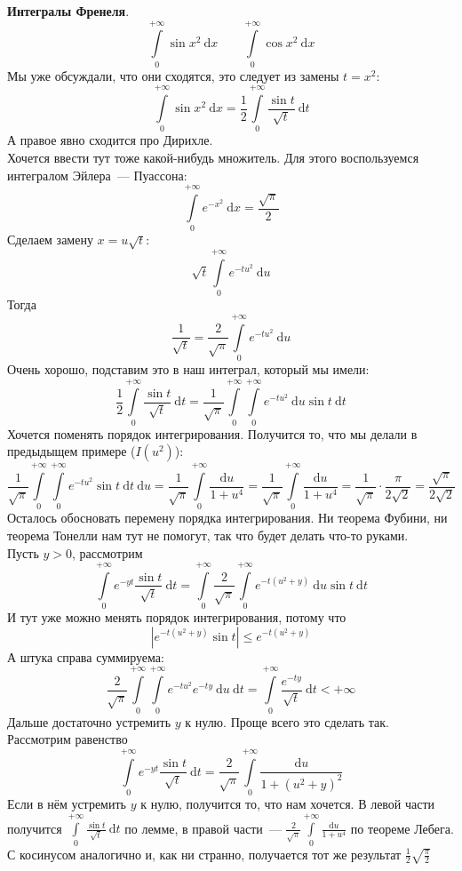 \documentclass{article}
\begin{document}
    \begin{example}
        \textbf{Интегралы Френеля}.\\
        $$
        \int\limits_0^{+\infty}\sin x^2~\mathrm dx\qquad\int\limits_0^{+\infty}\cos x^2~\mathrm dx
        $$
        Мы уже обсуждали, что они сходятся, это следует из замены $t=x^2$:
        $$
        \int\limits_0^{+\infty}\sin x^2~\mathrm dx=\frac12\int\limits_0^{+\infty}\frac{\sin t}{\sqrt t}~\mathrm dt
        $$
        А правое явно сходится про Дирихле.\\
        Хочется ввести тут тоже какой-нибудь множитель. Для этого воспользуемся интегралом Эйлера~--- Пуассона:
        $$
        \int\limits_0^{+\infty}e^{-x^2}~\mathrm dx=\frac{\sqrt\pi}2
        $$
        Сделаем замену $x=u\sqrt t$:
        $$
        \sqrt t\int\limits_0^{+\infty}e^{-tu^2}~\mathrm du
        $$
        Тогда
        $$
        \frac1{\sqrt t}=\frac2{\sqrt\pi}\int\limits_0^{+\infty}e^{-tu^2}~\mathrm du
        $$
        Очень хорошо, подставим это в наш интеграл, который мы имели:
        $$
        \frac12\int\limits_0^{+\infty}\frac{\sin t}{\sqrt t}~\mathrm dt=
        \frac1{\sqrt\pi}\int\limits_0^{+\infty}\int\limits_0^{+\infty}e^{-tu^2}~\mathrm du\sin t~\mathrm dt
        $$
        Хочется поменять порядок интегрирования. Получится то, что мы делали в предыдыщем примере ($I(u^2)$):
        $$
        \frac1{\sqrt\pi}\int\limits_0^{+\infty}\int\limits_0^{+\infty}e^{-tu^2}\sin t~\mathrm dt~\mathrm du=\frac1{\sqrt\pi}\int\limits_0^{+\infty}\frac{\mathrm du}{1+u^4}=\frac1{\sqrt\pi}\int\limits_0^{+\infty}\frac{\mathrm du}{1+u^4}=\frac1{\sqrt\pi}\cdot\frac\pi{2\sqrt 2}=\frac{\sqrt\pi}{2\sqrt 2}
        $$
        Осталось обосновать перемену порядка интегрирования. Ни теорема Фубини, ни теорема Тонелли нам тут не помогут, так что будет делать что-то руками.\\
        Пусть $y>0$, рассмотрим
        $$
        \int\limits_0^{+\infty}e^{-yt}\frac{\sin t}{\sqrt t}~\mathrm dt=\int\limits_0^{+\infty}\frac2{\sqrt\pi}\int\limits_0^{+\infty}e^{-t(u^2+y)}~\mathrm du\sin t~\mathrm dt
        $$
        И тут уже можно менять порядок интегрирования, потому что
        $$
        \left|e^{-t(u^2+y)}\sin t\right|\leqslant e^{-t(u^2+y)}
        $$
        А штука справа суммируема:
        $$
        \frac2{\sqrt\pi}\int\limits_0^{+\infty}\int\limits_0^{+\infty}e^{-tu^2}e^{-ty}~\mathrm du~\mathrm dt=\int\limits_0^{+\infty}\frac{e^{-ty}}{\sqrt t}~\mathrm dt<+\infty
        $$
        Дальше достаточно устремить $y$ к нулю. Проще всего это сделать так. Рассмотрим равенство
        $$
        \int\limits_0^{+\infty}e^{-yt}\frac{\sin t}{\sqrt t}~\mathrm dt=\frac2{\sqrt\pi}\int\limits_0^{+\infty}\frac{\mathrm du}{1+(u^2+y)^2}
        $$
        Если в нём устремить $y$ к нулю, получится то, что нам хочется. В левой части получится $\int\limits_0^{+\infty}\frac{\sin t}{\sqrt t}~\mathrm dt$ по лемме, в правой части~--- $\frac2{\sqrt\pi}\int\limits_0^{+\infty}\frac{\mathrm du}{1+u^4}$ по теореме Лебега.\\
        С косинусом аналогично и, как ни странно, получается тот же результат $\frac12\sqrt{\frac\pi2}$
    \end{example}
\end{document}
